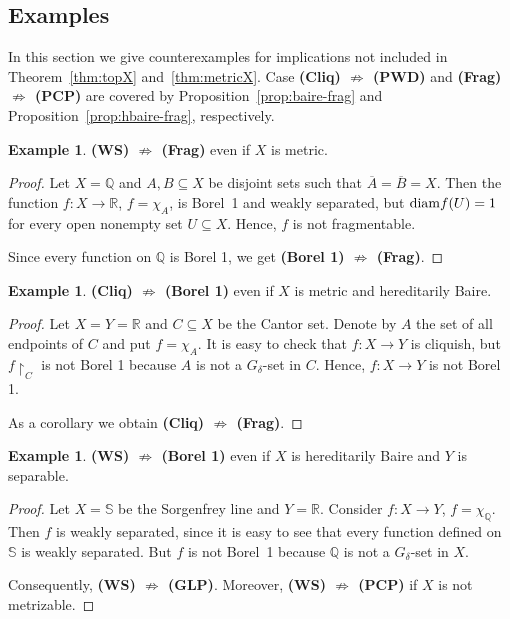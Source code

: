\documentclass[a4paper]{amsart}
\theoremstyle{plain}
\theoremstyle{definition}
\newtheorem{example}[theorem]{Example}
\theoremstyle{remark}
\numberwithin{equation}{section}
\begin{document}
 
 \subsection{Examples}
 \label{sec:examples}

 In this section we give counterexamples for implications not included in Theorem~\ref{thm:topX} and~\ref{thm:metricX}.
 Case {\bf (Cliq) $\not\Rightarrow$ (PWD)} and {\bf (Frag) $\not\Rightarrow$ (PCP)}
 are covered by Proposition~\ref{prop:baire-frag} and Proposition~\ref{prop:hbaire-frag}, respectively.


	
	\begin{example}
		{\bf (WS) $\not\Rightarrow$ (Frag)} even if $X$ is metric.
	\end{example}
	
	\begin{proof}
		Let $X=\mathbb Q$ and  $A,B\subseteq X$ be disjoint sets such that $\overline{A}=\overline{B}=X$. Then the function $f\colon X\to\mathbb R$, $f=\chi_A$, is Borel~1 and weakly separated, but ${\rm diam} f(U)=1$ for every open nonempty set $U\subseteq X$. Hence, $f$ is not fragmentable. 		
		
			Since every function on $\mathbb Q$ is Borel 1, we get	{\bf (Borel 1) $\not\Rightarrow$ (Frag)}.
	\end{proof}
	

	
		\begin{example}
		{\bf (Cliq) $\not\Rightarrow$ (Borel 1)} even if $X$ is metric and hereditarily Baire. 
	\end{example}
	
	\begin{proof}
		Let $X=Y=\mathbb R$  and $C\subseteq X$ be the Cantor set. Denote by $A$ the set of all endpoints of $C$ and put $f=\chi_A$. It is easy to check that $f\colon X\to Y$ is cliquish, but $f\restriction_C$ is not Borel 1 because $A$ is not a $G_\delta$-set in $C$. Hence, $f\colon X\to Y$ is not Borel 1. 
		
		As a corollary we obtain {\bf (Cliq) $\not\Rightarrow$ (Frag)}.
	 	\end{proof}
	 	
	 	\begin{example}
	 		{\bf (WS) $\not\Rightarrow$ (Borel 1)} even if $X$ is hereditarily Baire and $Y$ is separable.
	 	\end{example}
	 	
	 	\begin{proof}
	 		Let $X=\mathbb S$ be the Sorgenfrey line and $Y=\mathbb R$. Consider $f\colon X\to Y$, $f=\chi_{\mathbb Q}$. Then $f$ is weakly separated, since it is easy to see that every function defined on $\mathbb S$ is weakly separated. But $f$ is not Borel~1 because $\mathbb Q$ is not a $G_\delta$-set in $X$. 
	 		
	 		Consequently,	{\bf (WS) $\not\Rightarrow$ (GLP)}. Moreover, {\bf (WS) $\not\Rightarrow$ (PCP)} if $X$ is not metrizable. 
	 	\end{proof}
	
\end{document}
